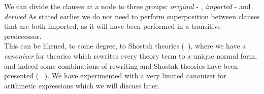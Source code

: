 \begin{itemize}


We can divide the clauses at a node to three groups: \emph{original} - , \emph{imported} -  and \emph{derived}
As stated earlier we do not need to perform superposition between clauses that are both imported, as it will have been performed in a transitive predecessor.\\


This can be likened, to some degree, to Shostak theories (~\cite{Shostak84}), where we have a \emph{canonizer} for theories which rewrites every theory term to a unique normal form, and indeed some combinations of rewriting and Shostak theories have been presented (~\cite{SuperpositionModuloShostak} ). We have experimented with a very limited canonizer for arithmetic expressions which we will discuss later.\\





\end{itemize}
